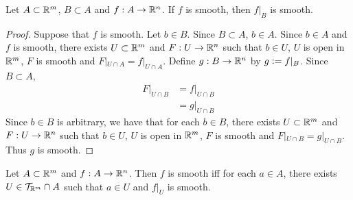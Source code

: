 \documentclass{book}
\begin{document}
	\begin{ex} 
		Let $A \subset \mathbb{R}^m$, $B \subset A$ and $f: A \rightarrow \mathbb{R}^n$. If $f$ is smooth, then $f|_B$ is smooth.
	\end{ex}

	\begin{proof}
		Suppose that $f$ is smooth. Let $b \in B$. Since $B \subset A$, $b \in A$. Since $b \in A$ and $f$ is smooth, there exists $U \subset \mathbb{R}^m$ and $F:U \rightarrow \mathbb{R}^n$ such that $b \in U$, $U$ is open in $\mathbb{R}^m$, $F$ is smooth and $F|_{U \cap A} = f|_{U \cap A}$. Define $g: B \rightarrow \mathbb{R}^n$ by $g \vcentcolon= f|_B$. Since $B \subset A$, 
		\begin{align*}
			F|_{U \cap B} 
			& = f|_{U \cap B} \\
			& = g|_{U \cap B}
		\end{align*} 
		Since $b \in B$ is arbitrary, we have that for each $b \in B$, there exists $U \subset \mathbb{R}^m$ and $F:U \rightarrow \mathbb{R}^n$ such that $b \in U$, $U$ is open in $\mathbb{R}^m$, $F$ is smooth and $F|_{U \cap B} = g|_{U \cap B}$. Thus $g$ is smooth.
	\end{proof}

	\begin{ex} 
		Let $A \subset \mathbb{R}^m$ and $f:A \rightarrow \mathbb{R}^n$. Then $f$ is smooth iff for each $a \in A$, there exists $U \in \mathcal{T}_{\mathbb{R}^m} \cap A$ such that $a \in U$ and $f|_U$ is smooth.  
	\end{ex}
\end{document}
